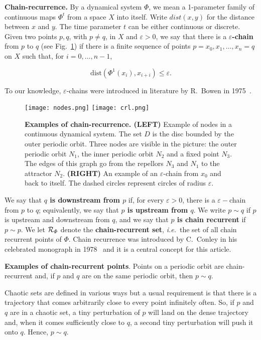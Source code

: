 \documentclass{article}
\def\gr{}
\newcommand{\BF}{\boldmath}
\newcommand{\ie}{{\it{i.e.}}}
\newcommand{\beq}{\begin{linenomath}\begin{equation}} %
\newcommand{\eeq}{\end{equation}\end{linenomath}} %
\begin{document}
{\bf Chain-recurrence.} By a dynamical system $\Phi$, we mean a 1-parameter family of continuous maps $\Phi^t$ from a space $X$ into itself. 
Write $dist(x,y)$ for the distance between $x$ and $y$. 
The time parameter $t$ can be either continuous or discrete. 
Given two points $p,q$, with $p\ne q$, in $X$ and $\varepsilon>0$, we say that there is a {\bf\BF$\varepsilon$-chain} from $p$ to $q$ (see Fig.~\ref{fig:cr}) if there is a finite sequence of points $p=x_0,x_1,\dots,x_n=q$ on $X$ such that, for $i=0,\dots,n-1$,
\beq
 \mbox{dist}(\Phi^{1}(x_i),x_{i+i})\le\varepsilon.
 \label{chain}
\eeq
%
To our knowledge, $\varepsilon$-chains were introduced in literature by R.~Bowen in 1975~\cite{Bow75}.

\begin{figure}
 \centering
 \texttt{[image: nodes.png]}
 \texttt{[image: crl.png]}
 \caption{{\bf Examples of chain-recurrence. (LEFT)} Example of nodes in a continuous dynamical system. The set $D$ is the disc bounded by the outer periodic orbit. 
Three nodes are visible in the picture: the
outer periodic orbit $N_1$, the inner periodic orbit $N_2$ and a fixed point $N_3$. 
 The edges of this \gr graph go from the repellors $N_3$ and $N_1$ to the attractor $N_2$.
 {\bf (RIGHT)} An example of an $\varepsilon$-chain from $x_0$ and back to itself. The dashed circles represent circles of radius $\varepsilon$.}
 \label{fig:cr}
\end{figure} 
%

We say that {\bf \BF $q$ is downstream from $p$} if, for every $\varepsilon> 0$, there is a $\varepsilon-$chain from $p$ to $q$; equivalently, we say that {\bf \BF $p$ is upstream from $q$}. 
We write {\BF$p\sim q$} if $p$ is upstream and downstream from $q$, and we say that {\bf \BF$p$ is chain recurrent} if $p\sim p$. 
We let {\BF${\cal R}_\Phi$} denote the {\bf chain-recurrent set}, \ie\ the set of all chain recurrent points of $\Phi$. 
Chain recurrence was introduced by C.~Conley in his celebrated monograph in 1978~\cite{Con78} and it is a central concept for this article.

{\bf Examples of chain-recurrent points}. Points on a periodic orbit are chain-recurrent and, if $p$ and $q$ are on the same periodic orbit, then $p\sim q$.

Chaotic sets are defined in various ways but a usual requirement is that there is a trajectory that comes arbitrarily close to every point infinitely often. So, if $p$ and $q$ are in a chaotic set, a tiny perturbation of $p$ will land on the dense trajectory and, when it comes sufficiently close to $q$, a second tiny perturbation will push it onto $q$. Hence, $p\sim q$. 
\end{document}
